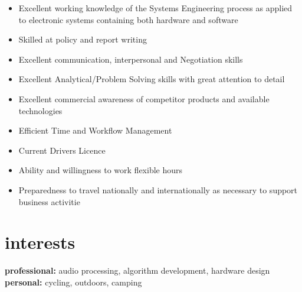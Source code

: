 \documentclass[]{friggeri-cv} %
\begin{document}
\begin{itemize}
    \item Excellent working knowledge of the Systems Engineering process as applied to electronic systems containing both hardware and software
    \item Skilled at policy and report writing
    \item Excellent communication, interpersonal and Negotiation skills
    \item Excellent Analytical/Problem Solving skills with great attention to detail
    \item Excellent commercial awareness of competitor products and available technologies
    \item Efficient Time and Workflow Management
    \item Current Drivers Licence
    \item Ability and willingness to work flexible hours
    \item Preparedness to travel nationally and internationally as necessary to support business activitie
\end{itemize}

\section{interests}

\textbf{professional:} audio processing, algorithm development, hardware design \textbf{personal:} cycling, outdoors, camping
\end{document}
